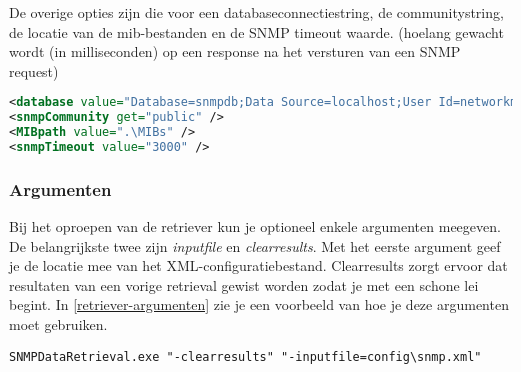 De overige opties zijn die voor een databaseconnectiestring, de communitystring, de locatie van de \gls{mib}-bestanden en de SNMP timeout waarde.
(hoelang gewacht wordt (in milliseconden) op een response na het versturen van een SNMP request)

\begin{lstlisting}[language=XML, float=h, caption={Overige opties in het XML-configuratiebestand}, label=xmlconfig-misc]
<database value="Database=snmpdb;Data Source=localhost;User Id=networkminer;Password=SomePassword;Port=3306;old syntax=yes" />
<snmpCommunity get="public" />
<MIBpath value=".\MIBs" />
<snmpTimeout value="3000" />
\end{lstlisting}


\subsubsection{Argumenten}
Bij het oproepen van de retriever kun je optioneel enkele argumenten meegeven.
De belangrijkste twee zijn \emph{inputfile} en \emph{clearresults}.
Met het eerste argument geef je de locatie mee van het XML-configuratiebestand.
Clearresults zorgt ervoor dat resultaten van een vorige retrieval gewist worden zodat je met een schone lei begint.
In \cref{retriever-argumenten} zie je een voorbeeld van hoe je deze argumenten moet gebruiken.

\begin{lstlisting}[float=h, caption={Oproepen van SNMP Data Retriever met twee argumenten}, label=retriever-argumenten]
SNMPDataRetrieval.exe "-clearresults" "-inputfile=config\snmp.xml"
\end{lstlisting}



